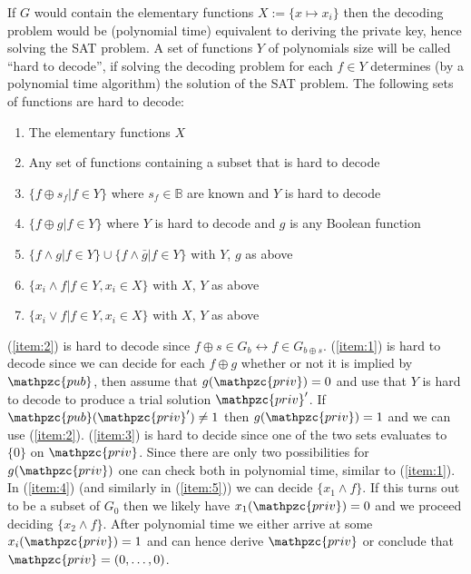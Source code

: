 \documentclass[final,journal,compsoc]{IEEEtran}
\newcommand{\priv}{\mathpzc{priv}}
\newcommand{\pub}{\mathpzc{pub}}
\begin{document}
If $G$ would contain the elementary functions $X:=\{x \mapsto x_i\}$
then the decoding problem would be (polynomial time) equivalent to
deriving the private key, hence solving the SAT problem.  A set of
functions $Y$ of polynomials size will be called ``hard to decode'',
if solving the decoding problem for each $f\in Y$ determines (by a
polynomial time algorithm) the solution of the SAT problem. 
The following
sets of functions are hard to decode:
\begin{enumerate}
\item\label{item:6} The elementary functions $X$

\item\label{item:7} Any set of functions containing a subset that is hard to decode

\item\label{item:2}
  $\{f \oplus s_f | f \in Y\}$ where $s_f \in \mathbb B$ are known and
  $Y$ is
  hard to decode

\item\label{item:1}
 $\{f \oplus g | f \in Y\}$ where
 $Y$ is hard to decode and $g$ is any Boolean function 

\item\label{item:3}  $\{f \wedge g | f \in Y\} \cup \{f \wedge \bar g | f \in Y\}$
  with $Y$, $g$ as above

\item\label{item:4} $\{x_i \wedge f | f \in Y, x_i \in X\}$ with $X$, $Y$ as above 

\item\label{item:5} $\{x_i \vee f | f \in Y, x_i \in X\}$ with $X$, $Y$ as above 

\end{enumerate}
(\ref{item:2}) is hard to decode since $f \oplus s \in G_b
\leftrightarrow f \in G_{b\oplus s}$.
(\ref{item:1}) is hard to decode since we can decide for each $f \oplus
g$ whether or not it is implied by $\pub$, then assume that
$g(\priv)=0$ and use that $Y$ is hard to decode to produce a trial
solution $\priv'$. If $\pub(\priv')\neq 1$ then $g(\priv)=1$ and we
can use (\ref{item:2}). (\ref{item:3}) is hard to decide since one of
the two sets evaluates to $\{0\}$ on $\priv$. Since there are only two
possibilities for $g(\priv)$ one can check both in polynomial time,
similar to (\ref{item:1}). In (\ref{item:4}) (and similarly in (\ref{item:5})) we can
decide $\{x_1 \wedge f\}$. If this turns out to be a subset of $G_0$
then we likely have $x_1(\priv)=0$ and we proceed deciding $\{x_2
\wedge f\}$. After polynomial time we either arrive at some $x_i(\priv)=1$
and can hence derive $\priv$ or conclude that $\priv =(0,\ldots,0)$.
\end{document}
